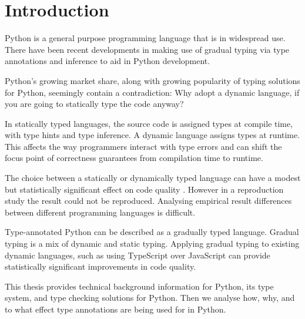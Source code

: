 \chapter{Introduction\label{intro}}

Python is a general purpose programming language that is in widespread use. There have been recent developments in making use of gradual typing via type annotations and inference to aid in Python development.

Python's growing market share, along with growing popularity of typing solutions for Python, seemingly contain a contradiction: Why adopt a dynamic language, if you are going to statically type the code anyway?

In statically typed languages, the source code is assigned types at compile time, with type hints and type inference. A dynamic language assigns types at runtime. This affects the way programmers interact with type errors and can shift the focus point of correctness guarantees from compilation time to runtime.

The choice between a statically or dynamically typed language can have a modest but statistically significant effect on code quality \cite{ray_codequality_2014}.
However in a reproduction study \cite{codequality_reproudction_2019} the result could not be reproduced. Analysing empirical result differences between different programming languages is difficult.

Type-annotated Python can be described as a gradually typed language. Gradual typing is a mix of dynamic and static typing. Applying gradual typing to existing dynamic languages, such as using TypeScript over JavaScript can provide statistically significant improvements in code quality. %

This thesis provides technical background information for Python, its type system, and type checking solutions for Python. Then we analyse how, why, and to what effect type annotations are being used for in Python.

